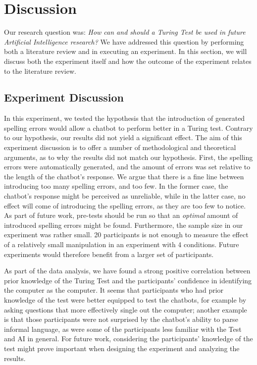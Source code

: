\section{Discussion}
Our research question was: \textit{How can and should a Turing Test be used in future Artificial Intelligence research?} We have addressed this question by performing both a literature review and in executing an experiment. In this section, we will discuss both the experiment itself and how the outcome of the experiment relates to the literature review.

\subsection{Experiment Discussion}
In this experiment, we tested the hypothesis that the introduction of generated spelling errors would allow a chatbot to perform better in a Turing test. Contrary to our hypothesis, our results did not yield a significant effect. The aim of this experiment discussion is to offer a number of methodological and theoretical arguments, as to why the results did not match our hypothesis. First, the spelling errors were automatically generated, and the amount of errors was set relative to the length of the chatbot's response. We argue that there is a fine line between introducing too many spelling errors, and too few. In the former case, the chatbot's response might be perceived as unreliable, while in the latter case, no effect will come of introducing the spelling errors, as they are too few to notice. As part of future work, pre-tests should be run so that an \textit{optimal} amount of introduced spelling errors might be found.           Furthermore, the sample size in our experiment was rather small. 20 participants is not enough to measure the effect of a relatively small manipulation in an experiment with 4 conditions. Future experiments would therefore benefit from a larger set of participants.

As part of the data analysis, we have found a strong positive correlation between prior knowledge of the Turing Test and the participants' confidence in identifying the computer as the computer. It seems that participants who had prior knowledge of the test were better equipped to test the chatbots, for example by asking questions that more effectively single out the computer; another example is that those participants were not surprised by the chatbot's ability to parse informal language, as were some of the participants less familiar with the Test and AI in general. For future work, considering the participants' knowledge of the test might prove important when designing the experiment and analyzing the results.


